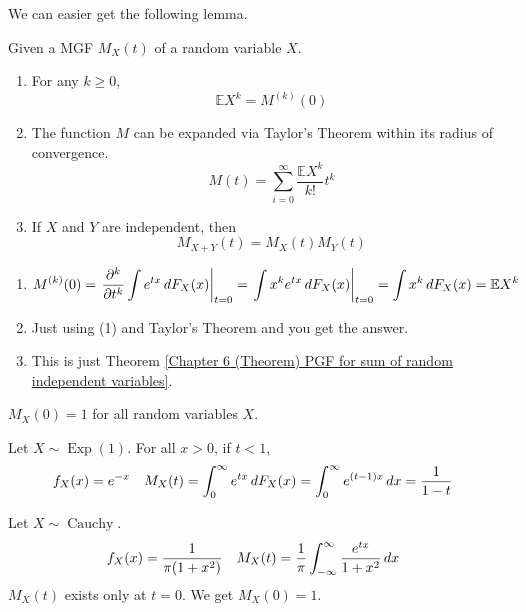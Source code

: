 \documentclass{huhtakm-template-book}
\newcommand{\expect}{\mathbb{E}}
\DeclareMathOperator{\Exp}{Exp}
\DeclareMathOperator{\Cauchy}{Cauchy}
\begin{document}
\newpage
We can easier get the following lemma.
\begin{lem}
	Given a MGF $M_{X}(t)$ of a random variable $X$. 
	\begin{enumerate}
		\item For any $k\geq 0$,
		\begin{equation*}
			\expect X^{k}=M^{(k)}(0)
		\end{equation*}
		\item The function $M$ can be expanded via Taylor's Theorem within its radius of convergence.
		\begin{equation*}
			M(t)=\sum_{i=0}^{\infty}\frac{\expect X^{k}}{k!}t^{k}
		\end{equation*}
		\item If $X$ and $Y$ are independent, then
		\begin{equation*}
			M_{X+Y}(t)=M_{X}(t)M_{Y}(t)
		\end{equation*}
	\end{enumerate}
\end{lem}
\begin{proofing}
	\begin{enumerate}
		\item 
		\begin{equation*}
			M^{(k)}(0)=\left.\pdv*[order={k}]{\int e^{tx}\,dF_{X}(x)}{t}\right|_{t=0}=\left.\int x^{k}e^{tx}\,dF_{X}(x)\right|_{t=0}=\int x^{k}\,dF_{X}(x)=\expect X^{k}
		\end{equation*}
		\item Just using (1) and Taylor's Theorem and you get the answer.
		\item This is just Theorem \ref{Chapter 6 (Theorem) PGF for sum of random independent variables}.
	\end{enumerate}
\end{proofing}
\begin{rem}
	$M_{X}(0)=1$ for all random variables $X$.
\end{rem}
\begin{eg}
	Let $X\sim\Exp(1)$. For all $x>0$, if $t<1$,
	\begin{align*}
		f_{X}(x)&=e^{-x} & M_{X}(t)&=\int_{0}^{\infty}e^{tx}\,dF_{X}(x)=\int_{0}^{\infty}e^{(t-1)x}\,dx=\frac{1}{1-t}
	\end{align*}
\end{eg}
\begin{eg}
	Let $X\sim\Cauchy$.
	\begin{align*}
		f_{X}(x)&=\frac{1}{\pi(1+x^{2})} & M_{X}(t)&=\frac{1}{\pi}\int_{-\infty}^{\infty}\frac{e^{tx}}{1+x^{2}}\,dx
	\end{align*}
	$M_{X}(t)$ exists only at $t=0$. We get $M_{X}(0)=1$.
\end{eg}
\end{document}
